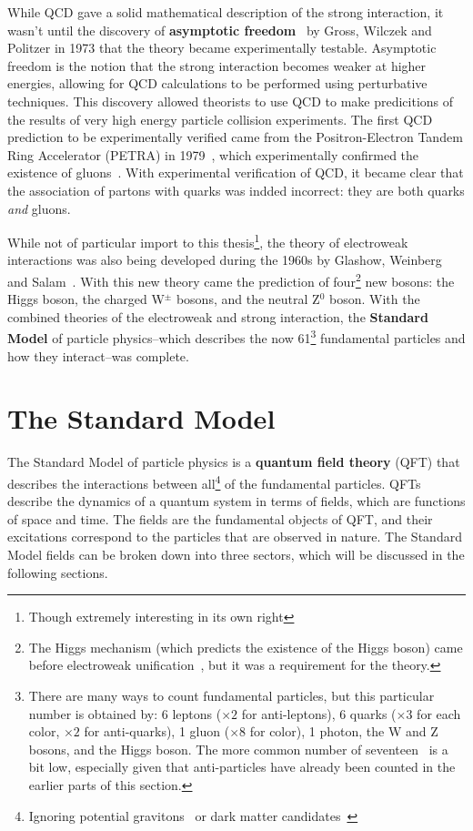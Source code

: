 While QCD gave a solid mathematical description of the strong interaction, it wasn't until the discovery of \textbf{asymptotic freedom}~\cite{AssFreedom1, AssFreedom2} by Gross, Wilczek and Politzer in 1973 that the theory became experimentally testable. Asymptotic freedom is the notion that the strong interaction becomes weaker at higher energies, allowing for QCD calculations to be performed using perturbative techniques. This discovery allowed theorists to use QCD to make predicitions of the results of very high energy particle collision experiments. The first QCD prediction to be experimentally verified came from the Positron-Electron Tandem Ring Accelerator (PETRA) in 1979~\cite{PETRA}, which experimentally confirmed the existence of gluons~\cite{GluonConfirmation}. With experimental verification of QCD, it became clear that the association of partons with quarks was indded incorrect: they are both quarks \textit{and} gluons.

While not of particular import to this thesis\footnote{Though extremely interesting in its own right}, the theory of electroweak interactions was also being developed during the 1960s by Glashow, Weinberg and Salam~\cite{Electroweak1, Electroweak2}. With this new theory came the prediction of four\footnote{The Higgs mechanism (which predicts the existence of the Higgs boson) came before electroweak unification~\cite{HiggsPaper}, but it was a requirement for the theory.} new bosons: the Higgs boson, the charged W$^{\pm}$ bosons, and the neutral Z$^{0}$ boson. With the combined theories of the electroweak and strong interaction, the \textbf{Standard Model} of particle physics--which describes the now 61\footnote{There are many ways to count fundamental particles, but this particular number is obtained by: 6 leptons ($\times 2$ for anti-leptons), 6 quarks ($\times 3$ for each color, $\times 2$ for anti-quarks), 1 gluon ($\times 8$ for color), 1 photon, the W and Z bosons, and the Higgs boson. The more common number of seventeen~\cite{ParticleNumber} is a bit low, especially given that anti-particles have already been counted in the earlier parts of this section.} fundamental particles and how they interact--was complete. 


\section{The Standard Model}
\label{sec:standard_model}

The Standard Model of particle physics is a \textbf{quantum field theory} (QFT) that describes the interactions between all\footnote{Ignoring potential gravitons~\cite{Graviton} or dark matter candidates~\cite{DarkMatter1, DarkMatter2}} of the fundamental particles. QFTs describe the dynamics of a quantum system in terms of fields, which are functions of space and time. The fields are the fundamental objects of QFT, and their excitations correspond to the particles that are observed in nature. The Standard Model fields can be broken down into three sectors, which will be discussed in the following sections.

